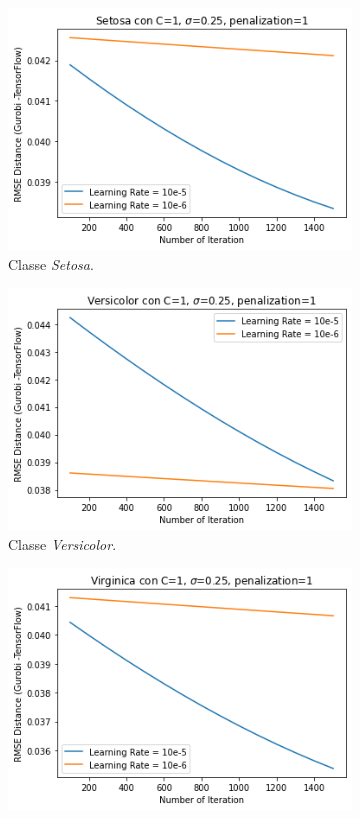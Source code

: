 \documentclass[a4paper,12pt]{report}
\begin{document}
\begin{figure}[H]
    \begin{subfigure}{0.47\textwidth}
        \centering
        \includegraphics[scale=0.5]{images/Grafici/Setosa_LearningRate.png}
        \caption{Classe \textit{Setosa}.}
        \label{subfig:Setosa_learning_rate}
    \end{subfigure}
    \begin{subfigure}{0.47\textwidth}
        \centering
        \includegraphics[scale=0.5]{images/Grafici/Versicolor_LearningRate.png}
        \caption{Classe \textit{Versicolor}.}
        \label{subfig:Versicolor_learning_rate}
    \end{subfigure}
    \newline
    \begin{subfigure}{\textwidth}
        \centering
        \includegraphics[scale=0.5]{images/Grafici/Virginica_LearningRate.png}

\end{subfigure}
\end{figure}
\end{document}
